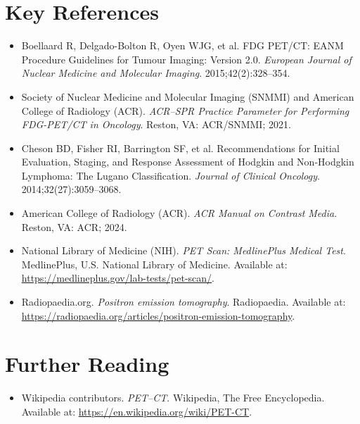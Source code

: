 \section{Key References}

\begin{itemize}
    \item Boellaard R, Delgado-Bolton R, Oyen WJG, et al. FDG PET/CT: EANM Procedure Guidelines for Tumour Imaging: Version 2.0. \textit{European Journal of Nuclear Medicine and Molecular Imaging}. 2015;42(2):328--354.
    \item Society of Nuclear Medicine and Molecular Imaging (SNMMI) and American College of Radiology (ACR). \textit{ACR--SPR Practice Parameter for Performing FDG-PET/CT in Oncology}. Reston, VA: ACR/SNMMI; 2021.
    \item Cheson BD, Fisher RI, Barrington SF, et al. Recommendations for Initial Evaluation, Staging, and Response Assessment of Hodgkin and Non-Hodgkin Lymphoma: The Lugano Classification. \textit{Journal of Clinical Oncology}. 2014;32(27):3059--3068.
    \item American College of Radiology (ACR). \textit{ACR Manual on Contrast Media}. Reston, VA: ACR; 2024.
    \item National Library of Medicine (NIH). \textit{PET Scan: MedlinePlus Medical Test}. MedlinePlus, U.S. National Library of Medicine. Available at: \url{https://medlineplus.gov/lab-tests/pet-scan/}.
    \item Radiopaedia.org. \textit{Positron emission tomography}. Radiopaedia. Available at: \url{https://radiopaedia.org/articles/positron-emission-tomography}.
\end{itemize}

\section{Further Reading}
\begin{itemize}
  \item Wikipedia contributors. \textit{PET--CT}. Wikipedia, The Free Encyclopedia. Available at: \url{https://en.wikipedia.org/wiki/PET-CT}.
\end{itemize}
